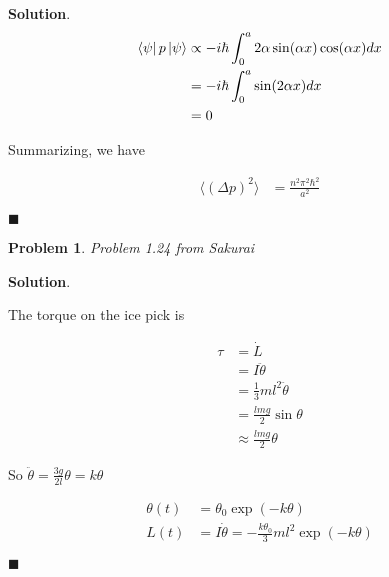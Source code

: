 \documentclass[12pt]{article}
\newtheorem{p}{Problem}
\theoremstyle{definition}
\newenvironment{s}{%
        \begin{trivlist} \item \textbf{Solution}. }{%
            \hspace*{\fill} $\blacksquare$\end{trivlist}}%
\begin{document}
{\begin{s}
\begin{align*}
\bra{\psi} p \ket{\psi} &\propto -i\hbar \int_{0}^{a} 2\alpha\sin(\alpha x)\cos(\alpha x)dx\\
&= -i\hbar \int_{0}^{a} \sin(2\alpha x)dx\\
&= 0
\end{align*}

Summarizing, we have

\begin{align*}
\langle (\Delta p)^{2}\rangle &= \frac{n^{2}\pi^{2}\hbar^{2}}{a^{2}}
\end{align*}



\end{s}

\begin{p}
Problem 1.24 from Sakurai
\end{p}

\begin{s} 

The torque on the ice pick is

\begin{align*}
\tau &= \dot{L} \\
&= I\ddot{\theta} \\
&= \frac{1}{3}ml^{2}\ddot{\theta}\\
&= \frac{lmg}{2}\sin\theta\\
&\approx \frac{lmg}{2}\theta
\end{align*}

So $\ddot{\theta} = \frac{3g}{2l}\theta = k\theta$

\begin{align*}
\theta(t) &= \theta_{0}\exp(-k\theta)\\
L(t) &= I\dot{\theta} = -\frac{k\theta_{0}}{3}ml^{2}\exp(-k\theta)
\end{align*}



\end{s}
\end{document}
